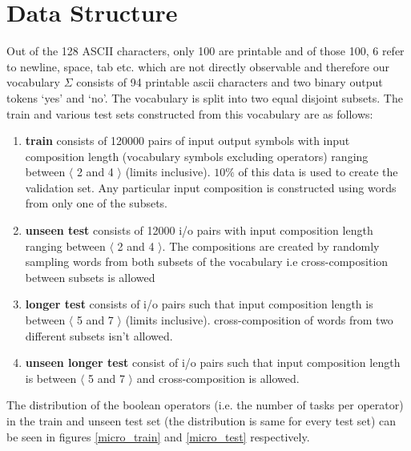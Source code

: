 \section{Data  Structure}
Out of the 128 ASCII characters, only 100 are printable and of those 100, 6 refer to newline, space, tab etc. which are not directly observable and therefore our vocabulary $\Sigma$ consists of 94 printable ascii characters and two binary output tokens \lq yes\rq{} and \lq no\rq{}. The vocabulary is split into two equal disjoint subsets. The train and various test sets constructed from this vocabulary are as follows:
\begin{enumerate}
	\item \textbf{train} consists of 120000 pairs of input output symbols with input composition length (vocabulary symbols excluding operators) ranging between $\langle$ 2 and 4 $\rangle$ (limits inclusive). $10\%$ of this data is used to create the validation set. Any particular input composition is constructed using words from only one of the subsets.
	\item \textbf{unseen test} consists of 12000 i/o pairs with input composition length ranging between $\langle$ 2 and 4 $\rangle$. The compositions are created by randomly sampling words from both subsets of the vocabulary i.e cross-composition between subsets is allowed
	\item \textbf{longer test} consists of i/o pairs such that input composition length is between $\langle$ 5 and 7 $\rangle$ (limits inclusive). cross-composition of words from two different subsets isn't allowed.
	\item \textbf{unseen longer test} consist of i/o pairs such that input composition length is between $\langle$ 5 and 7 $\rangle$ and cross-composition is allowed.
\end{enumerate}

The distribution of the boolean operators (i.e. the number of tasks per operator) in the train and unseen test set (the distribution is same for every test set) can be seen in figures \ref{micro_train} and \ref{micro_test} respectively.

